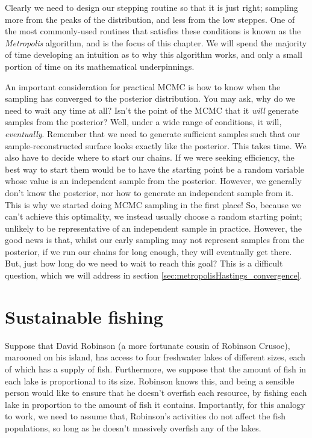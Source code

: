 \documentclass[11pt,fullpage]{book}
\begin{document}
Clearly we need to design our stepping routine so that it is just right; sampling more from the peaks of the distribution, and less from the low steppes. One of the most commonly-used routines that satisfies these conditions is known as the \textit{Metropolis} algorithm, and is the focus of this chapter. We will spend the majority of time developing an intuition as to why this algorithm works, and only a small portion of time on its mathematical underpinnings.

An important consideration for practical MCMC is how to know when the sampling has converged to the posterior distribution. You may ask, why do we need to wait any time at all? Isn't the point of the MCMC that it \textit{will} generate samples from the posterior? Well, under a wide range of conditions, it will, \textit{eventually}. Remember that we need to generate sufficient samples such that our sample-reconstructed surface looks exactly like the posterior. This takes time. We also have to decide where to start our chains. If we were seeking efficiency, the best way to start them would be to have the starting point be a random variable whose value is an independent sample from the posterior. However, we generally don't know the posterior, nor how to generate an independent sample from it. This is why we started doing MCMC sampling in the first place! So, because we can't achieve this optimality, we instead usually choose a random starting point; unlikely to be representative of an independent sample in practice. However, the good news is that, whilst our early sampling may not represent samples from the posterior, if we run our chains for long enough, they will eventually get there. But, just how long do we need to wait to reach this goal? This is a difficult question, which we will address in section \ref{sec:metropolisHastings_convergence}.

\section{Sustainable fishing}
Suppose that David Robinson (a more fortunate cousin of Robinson Crusoe), marooned on his island, has access to four freshwater lakes of different sizes, each of which has a supply of fish. Furthermore, we suppose that the amount of fish in each lake is proportional to its size. Robinson knows this, and being a sensible person would like to ensure that he doesn't overfish each resource, by fishing each lake in proportion to the amount of fish it contains. Importantly, for this analogy to work, we need to assume that, Robinson's activities do not affect the fish populations, so long as he doesn't massively overfish any of the lakes. 
\end{document}
